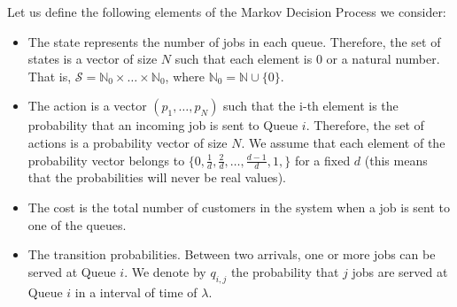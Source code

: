 \documentclass[a4paper,11pt]{article}
\begin{document}
Let us define the following elements of the Markov Decision Process we consider:
\begin{itemize}
\item The state represents the number of jobs in each queue. Therefore, the set of states is a vector of size $N$ such that each element is $0$ or a natural number. That is, $\mathcal S=\mathbb N_0\times \dots \times \mathbb N_0$, where $\mathbb N_0=\mathbb N \cup \{0\}$.
\item The action is a vector $(p_1,\dots,p_N)$ such that the i-th element is the probability that an incoming job is sent to Queue $i$. Therefore, the set of actions is a probability vector of size $N$. We assume that each element of the probability vector belongs to $\{0,\frac{1}{d},\frac{2}{d},\dots,\frac{d-1}{d},1,\}$ for a fixed $d$ (this means that the probabilities will never be real values).
\item The cost is the total number of customers in the system when a job is sent to one of the queues.
\item The transition probabilities. Between two arrivals, one or more jobs can be served at Queue $i$. We denote by $q_{i,j}$ the probability that
$j$ jobs are served at Queue $i$ in a interval of time of $\lambda$. 
\end{itemize}



\end{document}
